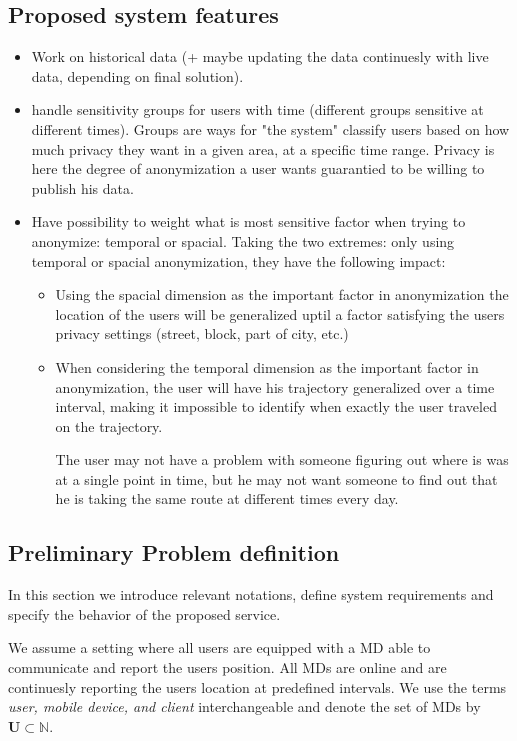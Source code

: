 \subsection{Proposed system features}
\begin{itemize}
	\item Work on historical data (+ maybe updating the data continuesly with live data, depending on final solution).
	\item handle sensitivity groups for users with time (different groups sensitive at different times).
Groups are ways for "the system" classify users based on how much privacy they want in a given area, at a specific
time range. Privacy is here the degree of anonymization a user wants guarantied to be willing to publish his data.
	\item Have possibility to weight what is most sensitive factor when trying to anonymize: temporal or spacial.
Taking the two extremes: only using temporal or spacial anonymization, they have the following impact:
	\begin{itemize}
		\item Using the spacial dimension as the important factor in anonymization the location of the users will be generalized
uptil a factor satisfying the users privacy settings (street, block, part of city, etc.)
		\item When considering the temporal dimension as the important factor in anonymization, the user will have his trajectory
generalized over a time interval, making it impossible to identify when exactly the user traveled on the trajectory.

The user may not have a problem with someone figuring out where is was at a single point in time, 
but he may not want someone to find out that he is taking the same route at different times every day.
	\end{itemize}
\end{itemize}



\subsection{Preliminary Problem definition}

In this section we introduce relevant notations, define system requirements and specify
the behavior of the proposed service. 

We assume a setting where all users are equipped with a \ac{MD} able to communicate and report
the users position. All  \ac{MD}s are online and are continuesly reporting the users location at
predefined intervals. We use the terms {\it user, mobile device, and client} interchangeable and 
denote the set of \ac{MD}s by  $\mathbf{U} \subset \mathbb{N}$.


